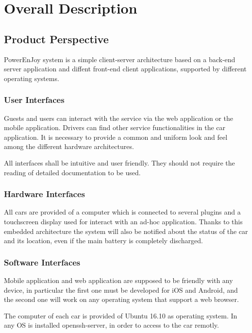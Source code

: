 \section{Overall Description}\label{sec overall-desc}

\subsection{Product Perspective}
PowerEnJoy system is a simple client-server architecture based on a back-end server application and diffent front-end client applications, supported by different operating systems.

\subsubsection{User Interfaces}
Guests and users can interact with the service via the web application or the mobile application. Drivers can find other service functionalities in the car application. It is necessary to provide a common and uniform look and feel among the different hardware architectures.

All interfaces shall be intuitive and user friendly. They should not require the reading of detailed documentation to be used.

\subsubsection{Hardware Interfaces}

All cars are provided of a computer which is connected to several plugins and a touchscreen display used for interact with an ad-hoc application.
Thanks to this embedded architecture the system will also be notified about the status of the car and its location, even if the main battery is completely discharged.

\subsubsection{Software Interfaces}

Mobile application and web application are supposed to be friendly with any device, in particular the first one must be developed for iOS and Android, and the second one will work on any operating system that support a web browser.

The computer of each car is provided of Ubuntu 16.10 as operating system. In any OS is installed openssh-server, in order to access
to the car remotly.

